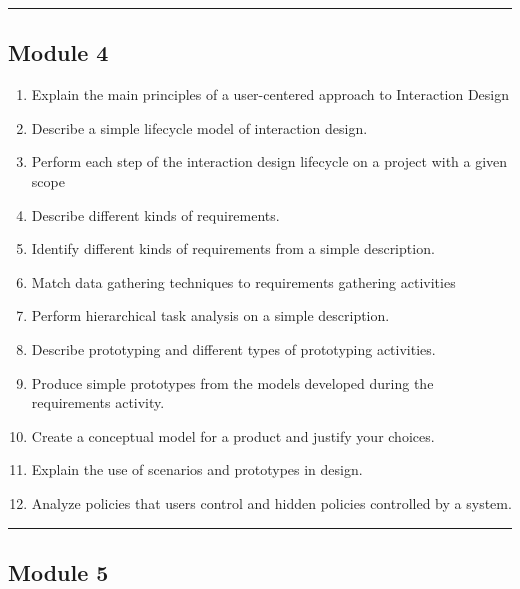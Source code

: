 \documentclass[]{article}
\providecommand{\tightlist}{%
  \setlength{\itemsep}{0pt}\setlength{\parskip}{0pt}}
\begin{document}
\begin{center}\rule{0.5\linewidth}{\linethickness}\end{center}

\hypertarget{module-4}{%
\subsection{Module 4}\label{module-4}}

\begin{enumerate}
\def\labelenumi{\arabic{enumi}.}
\tightlist
\item
  Explain the main principles of a user-centered approach to Interaction
  Design
\item
  Describe a simple lifecycle model of interaction design.
\item
  Perform each step of the interaction design lifecycle on a project
  with a given scope
\item
  Describe different kinds of requirements.
\item
  Identify different kinds of requirements from a simple description.
\item
  Match data gathering techniques to requirements gathering activities
\item
  Perform hierarchical task analysis on a simple description.
\item
  Describe prototyping and different types of prototyping activities.
\item
  Produce simple prototypes from the models developed during the
  requirements activity.
\item
  Create a conceptual model for a product and justify your choices.
\item
  Explain the use of scenarios and prototypes in design.
\item
  Analyze policies that users control and hidden policies controlled by
  a system.
\end{enumerate}

\begin{center}\rule{0.5\linewidth}{\linethickness}\end{center}

\hypertarget{module-5}{%
\subsection{Module 5}\label{module-5}}
\end{document}
